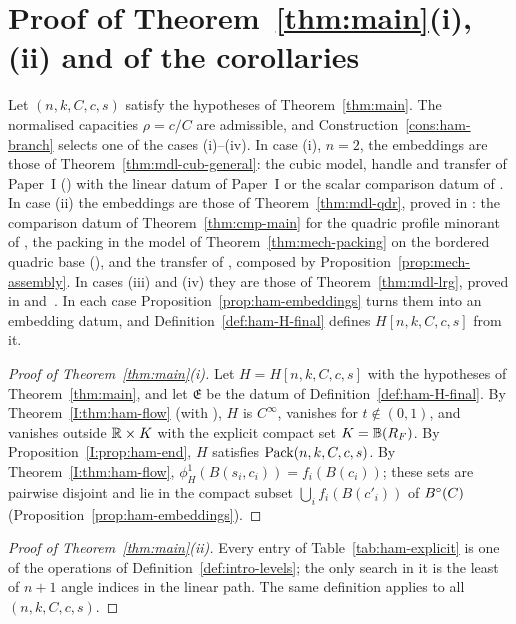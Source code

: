 \section{Proof of Theorem~\texorpdfstring{\ref{thm:main}}{1}\textup{(i)}, \textup{(ii)} and of the corollaries}\label{p2:sec-proof}

Let $(n,k,C,c,s)$ satisfy the hypotheses of Theorem~\ref{thm:main}. The normalised capacities $\rho=c/C$ are
admissible, and Construction~\ref{cons:ham-branch} selects one of the cases (i)--(iv). In case (i), $n=2$, the
embeddings are those of Theorem~\ref{thm:mdl-cub-general}: the cubic model, handle and transfer of Paper~I
() with the linear datum of Paper~I or the scalar comparison datum of
. In case (ii) the
embeddings are those of Theorem~\ref{thm:mdl-qdr}, proved in : the comparison datum of
Theorem~\ref{thm:cmp-main} for the quadric profile minorant of , the packing in the model
of Theorem~\ref{thm:mech-packing} on the bordered quadric base (), and the transfer of
, composed by Proposition~\ref{prop:mech-assembly}. In cases (iii) and (iv) they are
those of Theorem~\ref{thm:mdl-lrg}, proved in  and~. In each case
Proposition~\ref{prop:ham-embeddings} turns them into an embedding datum, and Definition~\ref{def:ham-H-final} defines
$H[n,k,C,c,s]$ from it.

\begin{proof}[Proof of Theorem~\ref{thm:main}\textup{(i)}]
Let $H=H[n,k,C,c,s]$ with the hypotheses of Theorem~\ref{thm:main}, and let $\mathfrak E$ be the datum of
Definition~\ref{def:ham-H-final}. By Theorem~\ref{I:thm:ham-flow} (with ), $H$ is $C^\infty$, vanishes for $t\notin(0,1)$, and vanishes
outside $\mathbb{R}\times K$ with the explicit compact set $K=\mathbb{B}(R_F)$. By Proposition~\ref{I:prop:ham-end}, $H$ satisfies
$\mathrm{Pack}(n,k,C,c,s)$. By Theorem~\ref{I:thm:ham-flow}, $\phi^1_H(B(s_i,c_i))=f_i(B(c_i))$; these sets are pairwise disjoint and lie
in the compact subset $\bigcup_if_i(B(c'_i))$ of $B^{\circ}(C)$ (Proposition~\ref{prop:ham-embeddings}).
\end{proof}

\begin{proof}[Proof of Theorem~\ref{thm:main}\textup{(ii)}]
Every entry of Table~\ref{tab:ham-explicit} is one of the operations of Definition~\ref{def:intro-levels}; the only search
in it is the least of $n+1$ angle indices in the linear path. The same definition applies to all
$(n,k,C,c,s)$.
\end{proof}

